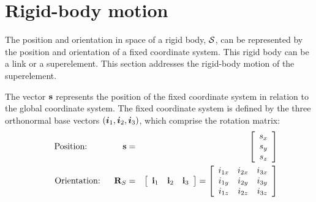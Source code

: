 \section{Rigid-body motion}
\label{s:Rigid-body motion}

The position and orientation in space of a rigid body, $\cal S$, can be
represented by the position and orientation of a fixed coordinate system.
This rigid body can be a link or a superelement.
This section addresses the rigid-body motion of the superelement.

The vector $\bf s$ represents the position of the fixed coordinate system
in relation to the global coordinate system.
The fixed coordinate system is defined by the three orthonormal base vectors
$({\boldsymbol{i}}_1,{\boldsymbol{i}}_2,{\boldsymbol{i}}_3)$, which comprise the rotation matrix:
%
\begin{eqnarray}
\makebox[28mm]{Position:\hfill} {\mf s} &=&
\left[\begin{array}{c} s_x\\ s_y\\ s_z \end{array}\right]
\label{eq:posVec} \\
\makebox[30mm]{Orientation:} {\mf R}_S &=&
\left[\begin{array}{ccc} {\mf i}_1 & {\mf i}_2 & {\mf i}_3 \end{array}\right] =
\left[\begin{array}{ccc}
i_{1x} & i_{2x} & i_{3x} \\
i_{1y} & i_{2y} & i_{3y} \\
i_{1z} & i_{2z} & i_{3z}
\end{array}\right]
\label{eq:rotMat}
\end{eqnarray}

